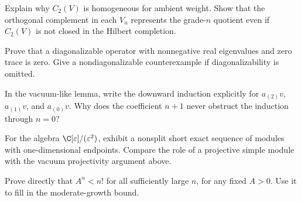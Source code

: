 \begin{exercise}\label{ex:c-regular-1}
Explain why $C_2(V)$ is homogeneous for ambient weight. Show that the
orthogonal complement in each $V_n$ represents the grade-$n$ quotient
even if $C_2(V)$ is not closed in the Hilbert completion.

\par\smallskip{}\par
\end{exercise}
\begin{exercise}\label{ex:c-regular-2}
Prove that a diagonalizable operator with nonnegative real eigenvalues
and zero trace is zero. Give a nondiagonalizable counterexample if
diagonalizability is omitted.

\par\smallskip{}\par
\end{exercise}
\begin{exercise}\label{ex:c-regular-3}
In the vacuum-like lemma, write the downward induction explicitly for
$a_{(2)}v$, $a_{(1)}v$, and $a_{(0)}v$. Why does the coefficient
$n+1$ never obstruct the induction through $n=0$?

\par\smallskip{}\par
\end{exercise}
\begin{exercise}\label{ex:c-regular-4}
For the algebra $\C[\varepsilon]/(\varepsilon^2)$, exhibit a nonsplit
short exact sequence of modules with one-dimensional endpoints.
Compare the role of a projective simple module with the vacuum
projectivity argument above.

\par\smallskip{}\par
\end{exercise}
\begin{exercise}\label{ex:c-regular-5}
Prove directly that $A^n<n!$ for all sufficiently large $n$, for any
fixed $A>0$. Use it to fill in the moderate-growth bound.

\par\smallskip{}\par
\end{exercise}
